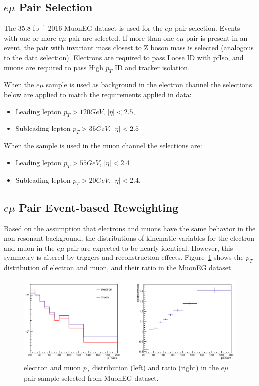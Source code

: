 \subsection{$e\mu$ Pair Selection}
The 35.8 fb$^{-1}$ 2016 MuonEG dataset is used for the $e\mu$ pair selection.  Events with one or more $e\mu$ pair are selected. If more than one $e\mu$ pair is present in an event, the pair with invariant mass closest to Z boson mass is selected (analogous to the data selection). Electrons are required to pass Loose ID with pfIso, and muons are required to pass High $p_T$ ID and tracker isolation. 

\vspace{0.3cm}
When the $e\mu$ sample is used as background in the electron channel the selections below are applied to match the requirements applied in data: 
\begin{itemize}
\item Leading lepton $p_{T}>120GeV$, $|\eta|<2.5$, 
\item Subleading lepton $p_{T}>35GeV$, $|\eta|<2.5$
\end{itemize}
When the sample is used in the muon channel the selections are:
\begin{itemize}
\item Leading lepton $p_{T}>55GeV$, $|\eta|<2.4$
\item Subleading lepton $p_{T}>20GeV$, $|\eta|<2.4$. 
\end{itemize}

\subsection{$e\mu$ Pair Event-based Reweighting}
Based on the assumption that electrons and muons have the same behavior in the non-resonant background, the distributions of kinematic variables for the electron and muon in the $e\mu$ pair are expected to be nearly identical. However, this symmetry is altered by triggers and reconstruction effects. Figure~\ref{fig:nonresmuelpt} shows the $p_T$ distribution of electron and muon, and their ratio in the MuonEG dataset.

\begin{figure}[htbp]
\begin{center}
\includegraphics[width=0.95\linewidth]{figures/nonresmuelpt.png}
\caption{electron and muon $p_T$ distribution (left) and ratio (right) in the $e\mu$ pair sample selected from MuonEG dataset.}
\label{fig:nonresmuelpt}
\end{center}
\end{figure}

